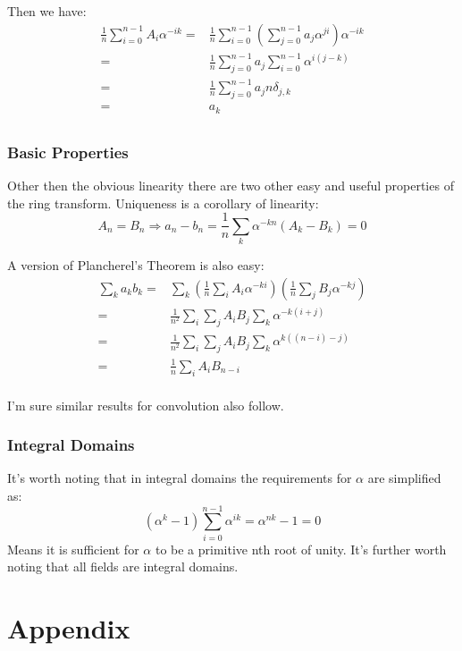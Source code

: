\documentclass[12pt]{report}
\begin{document}
Then we have:
\begin{equation*}
\begin{aligned}
	\frac{1}{n}\sum_{i=0}^{n-1}A_i\alpha^{-ik} =& 
	\frac{1}{n}\sum_{i=0}^{n-1}\left(\sum_{j=0}^{n-1}a_j\alpha^{ji}\right)\alpha^{-ik} \\ 
	=&\frac{1}{n}\sum_{j=0}^{n-1}a_j\sum_{i=0}^{n-1}\alpha^{i(j-k)} \\ 
	=&\frac{1}{n}\sum_{j=0}^{n-1}a_jn\delta_{j,k} \\ 
	=&a_k \\ 
\end{aligned}
\end{equation*}

\subsection{Basic Properties}
Other then the obvious linearity there are two other easy and useful properties of the ring transform.
Uniqueness is a corollary of linearity:
\[A_n=B_n \Rightarrow a_n-b_n = \frac{1}{n}\sum_k\alpha^{-kn}(A_k-B_k) = 0\]

A version of Plancherel's Theorem is also easy:
\begin{equation*}
\begin{aligned}
	\sum_k a_kb_k =& \sum_k \left(\frac{1}{n}\sum_iA_i\alpha^{-ki}\right) \left(\frac{1}{n}\sum_jB_j\alpha^{-kj}\right) \\
	=&  \frac{1}{n^2}\sum_i\sum_jA_iB_j \sum_k\alpha^{-k(i+j)}  \\
	=&  \frac{1}{n^2}\sum_i\sum_jA_iB_j \sum_k\alpha^{k((n-i)-j)}  \\
	=&  \frac{1}{n}\sum_iA_iB_{n-i}  \\
\end{aligned}
\end{equation*}

I'm sure similar results for convolution also follow.

\subsection{Integral Domains}
It's worth noting that in integral domains the requirements for $\alpha$ are simplified as:
\[(\alpha^k-1)\sum_{i=0}^{n-1}\alpha^{ik} = \alpha^{nk}-1 = 0\]
Means it is sufficient for $\alpha$ to be a primitive nth root of unity.
It's further worth noting that all fields are integral domains.

\appendix	
\chapter{Appendix}
\end{document}
